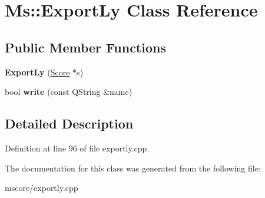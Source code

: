 \hypertarget{class_ms_1_1_export_ly}{}\section{Ms\+:\+:Export\+Ly Class Reference}
\label{class_ms_1_1_export_ly}
\subsection*{Public Member Functions}
\begin{DoxyCompactItemize}
\item 
\mbox{\label{class_ms_1_1_export_ly_a9a021c195af18ee34e190835666053c6}} 
{\bfseries Export\+Ly} (\hyperlink{class_ms_1_1_score}{Score} $\ast$s)
\item 
\mbox{\label{class_ms_1_1_export_ly_ae30336eafe9f7c59535f47710fc7b751}} 
bool {\bfseries write} (const Q\+String \&name)
\end{DoxyCompactItemize}


\subsection{Detailed Description}


Definition at line 96 of file exportly.\+cpp.



The documentation for this class was generated from the following file\+:\begin{DoxyCompactItemize}
\item 
mscore/exportly.\+cpp\end{DoxyCompactItemize}
